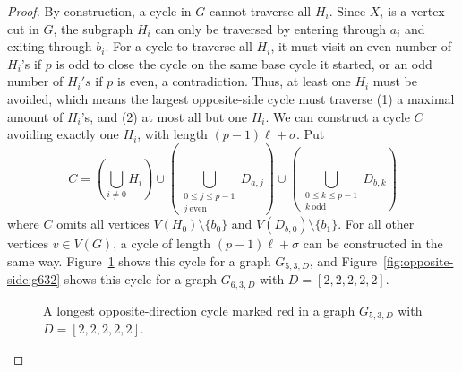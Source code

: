 \begin{proof}
By construction, a cycle in $G$ cannot traverse all $H_i$. Since $X_i$ is a vertex-cut in $G$, the subgraph $H_i$ can only be traversed by entering through $a_i$ and exiting through $b_i$. For a cycle to traverse all $H_i$, it must visit an even number of $H_i$'s if $p$ is odd to close the cycle on the same base cycle it started, or an odd number of $H_i's$ if $p$ is even, a contradiction. Thus, at least one $H_i$ must be avoided, which means the largest opposite-side cycle must traverse (1) a maximal amount of $H_i$'s, and (2) at most all but one $H_i$. We can construct a cycle $C$ avoiding exactly one $H_i$, with length $(p-1)\ell + \sigma$. Put
\[
C=
\left(
\bigcup_{i\neq 0} H_i
\right)
\cup
\left(
\bigcup_{\substack{0\leq j\leq p-1\\[2pt] j\ \mathrm{even}}} D_{a,j}
\right)
\cup
\left(
\bigcup_{\substack{0\leq k\leq p-1\\[2pt] k\ \mathrm{odd}}} D_{b,k}
\right)
\]
where $C$ omits all vertices $V(H_0)\setminus\{b_0\}$ and $V(D_{b,0})\setminus\{b_1\}$. For all other vertices $v \in V(G)$, a cycle of length $(p-1)\ell + \sigma$ can be constructed in the same way. Figure~\ref{fig:opposite-side:g532} shows this cycle for a graph $G_{5,3,D}$, and Figure~\ref{fig:opposite-side:g632} shows this cycle for a graph $G_{6,3,D}$ with $D=[2,2,2,2,2]$.

\begin{figure}
  \centering
  \caption{A longest opposite-direction cycle marked red in a graph $G_{5,3,D}$ with $D=[2,2,2,2,2]$.}
  \label{fig:opposite-side:g532}
\end{figure}

\begin{figure}
  \centering
\end{figure}
\end{proof}
